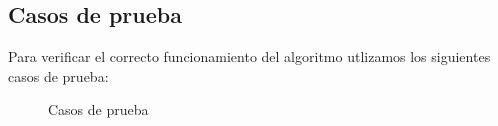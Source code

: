 \subsection{Casos de prueba}

Para verificar el correcto funcionamiento del algoritmo utlizamos los siguientes casos de prueba:

\begin{figure}[H]
 \centering
 \caption{Casos de prueba}
 \label{}
\end{figure}

